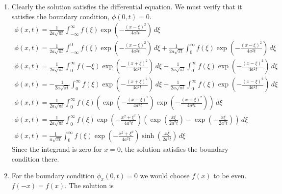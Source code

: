 {%
\begin{Solution}
  \begin{enumerate}
  \item
    Clearly the solution satisfies the differential equation.  We must
    verify that it satisfies the boundary condition, $\phi(0,t) = 0$.
    \begin{gather*}
      \phi(x,t) = \frac{1}{2 a \sqrt{\pi t} } \int_{-\infty}^{\infty}
      f(\xi) \exp\left( - \frac{(x-\xi)^2}{4 a^2 t} \right) \,d\xi \\
      \phi(x,t) = \frac{1}{2 a \sqrt{\pi t} } \int_{-\infty}^{0}
      f(\xi) \exp\left( - \frac{(x-\xi)^2}{4 a^2 t} \right) \,d\xi 
      + \frac{1}{2 a \sqrt{\pi t} } \int_{0}^{\infty}
      f(\xi) \exp\left( - \frac{(x-\xi)^2}{4 a^2 t} \right) \,d\xi \\
      \phi(x,t) = \frac{1}{2 a \sqrt{\pi t} } \int_0^{\infty}
      f(-\xi) \exp\left( - \frac{(x+\xi)^2}{4 a^2 t} \right) \,d\xi 
      + \frac{1}{2 a \sqrt{\pi t} } \int_{0}^{\infty}
      f(\xi) \exp\left( - \frac{(x-\xi)^2}{4 a^2 t} \right) \,d\xi \\
      \phi(x,t) = - \frac{1}{2 a \sqrt{\pi t} } \int_0^{\infty}
      f(\xi) \exp\left( - \frac{(x+\xi)^2}{4 a^2 t} \right) \,d\xi 
      + \frac{1}{2 a \sqrt{\pi t} } \int_{0}^{\infty}
      f(\xi) \exp\left( - \frac{(x-\xi)^2}{4 a^2 t} \right) \,d\xi \\
      \phi(x,t) = \frac{1}{2 a \sqrt{\pi t} } \int_0^{\infty}
      f(\xi) \left( \exp\left( - \frac{(x-\xi)^2}{4 a^2 t} \right)
        \exp\left( - \frac{(x+\xi)^2}{4 a^2 t} \right) \right) \,d\xi \\
      \phi(x,t) = \frac{1}{2 a \sqrt{\pi t} } \int_0^{\infty}
      f(\xi) \exp\left( - \frac{x^2 + \xi^2}{4 a^2 t} \right) \left( 
        \exp\left( \frac{x \xi}{2 a^2 t} \right)
        - \exp\left( - \frac{x \xi}{2 a^2 t} \right) \right) \,d\xi \\
      \boxed{
        \phi(x,t) = \frac{1}{a \sqrt{\pi t} } \int_0^{\infty}
        f(\xi) \exp\left( - \frac{x^2 + \xi^2}{4 a^2 t} \right) 
        \sinh \left( \frac{x \xi}{2 a^2 t} \right) \,d\xi
        }
    \end{gather*}
    Since the integrand is zero for $x = 0$, the solution
    satisfies the boundary condition there.
  \item
    For the boundary condition $\phi_x(0,t) = 0$ we would choose $f(x)$
    to be even.  $f(-x) = f(x)$.  The solution is
    \[
\]
\end{enumerate}
\end{Solution}}
